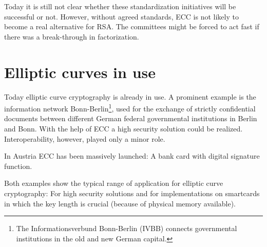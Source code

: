 Today it is still not clear whether these standardization initiatives will be
successful or not. However, without agreed standards, ECC is not likely to
become a real alternative for RSA. The committees might be forced to act fast
if there was a break-through in factorization.


\section{Elliptic curves in use}

Today elliptic curve cryptography is already in use. A prominent example is the information network Bonn-Berlin\footnote{The Informationsverbund Bonn-Berlin (IVBB) connects governmental institutions in the old and new German capital.}, used for the exchange of strictly confidential documents between different German federal governmental institutions in Berlin and Bonn. With the help of ECC a high security solution could be realized. Interoperability, however, played only a minor role.

In Austria ECC has been massively launched: A bank card with digital signature function.

Both examples show the typical range of application for elliptic curve cryptography: For high security solutions and for implementations on smartcards in which the key length is crucial (because of physical memory available).




